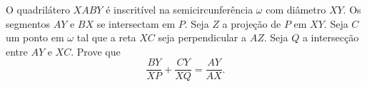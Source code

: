 O quadrilátero $XABY$ é inscritível na semicircunferência $\omega$ com diâmetro $XY$. Os segmentos $AY$ e $BX$ se intersectam em $P$. Seja $Z$ a projeção de $P$ em $XY$. Seja $C$ um ponto em $\omega$ tal que a reta $XC$ seja perpendicular a $AZ$. Seja $Q$ a intersecção entre $AY$ e $XC$. Prove que \[\frac{BY}{XP} + \frac{CY}{XQ} = \frac{AY}{AX}.\]
